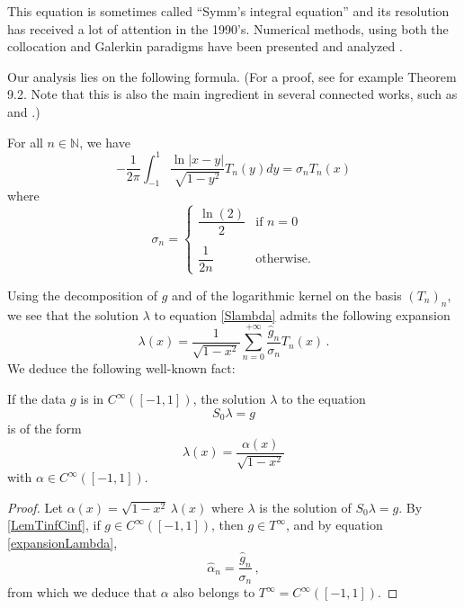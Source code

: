 \documentclass[a4paper]{article}
\begin{document}
This equation is sometimes called ``Symm's integral equation'' and its resolution has received a lot of attention in the 1990's. Numerical methods, using both the collocation and Galerkin paradigms have been presented and analyzed \cite{atkinson1991numerical,yan1988integral,yan1990cosine,sloan1992collocation,yan1989mesh}. 


Our analysis lies on the following formula. (For a proof, see for example \cite{mason2002chebyshev} Theorem 9.2. Note that this is also the main ingredient in several connected works, such as  \cite{bruno2012second} and \cite{jiang2004second}.)

\begin{Lem}
For all $n\in \mathbb{N}$, we have
	\[-\frac{1}{2\pi}\int_{-1}^{1} \frac{\ln|x-y|}{\sqrt{1 - y^2}}T_n(y)dy = \sigma_n T_n(x)\]
	where
	\[\sigma_n = \begin{cases}
	\dfrac{\ln(2)}{2} & \text{if } n=0\\
	\\
	\dfrac{1}{2n} & \text{otherwise}.
	\end{cases}\]
	\label{STn}
\end{Lem}

Using the decomposition of $g$ and of the logarithmic kernel on the basis $(T_n)_n$, we see that the solution $\lambda$ to equation \eqref{Slambda} admits the following expansion 
\begin{equation}
\lambda(x) = \frac{1}{\sqrt{1-x^2}}\sum_{n=0}^{+ \infty} \frac{\hat{g}_n}{\sigma_n} T_n(x)\,.
\label{expansionLambda}
\end{equation}
We deduce the following well-known fact:
\begin{Cor}
	\label{CorSingularity}
	If the data $g$ is in $C^{\infty}([-1,1])$, the solution $\lambda$ to the equation 
	\[S_0\lambda = g\]
	is of the form 
	\[\lambda(x) = \dfrac{\alpha(x)}{\sqrt{1-x^2}}\]
	with $\alpha \in C^{\infty}([-1,1])$.  
\end{Cor}

\begin{proof}
	Let $\alpha (x)= \sqrt{1 - x^2}\,\lambda(x)$ where $\lambda$ is the solution of $S_0\lambda = g$.  
	By \autoref{LemTinfCinf}, if $g \in C^{\infty}([-1,1])$, then $g \in T^{\infty}$, and by equation 
	\eqref{expansionLambda}, 
	\[ \hat{\alpha}_n = \frac{\hat{g}_n}{\sigma_n}\,,\]
		from which we deduce that $\alpha$ also  belongs to $T^{\infty} = C^{\infty}([-1,1])$. 
\end{proof}
\end{document}
